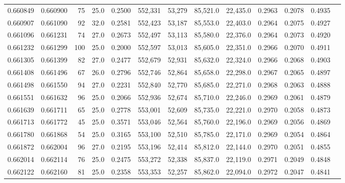 \begin{tabular}{rrrrrrrrrrrrr}
0.660849 & 0.660900 &    75 & 25.0 &                                     0.2500 & 552,331 &  53,279 &  85,521.0 &  22,435.0 & 0.2963 & 0.2078 & 0.4935 \\
0.660907 & 0.661090 &    92 & 32.0 &                                     0.2581 & 552,423 &  53,187 &  85,553.0 &  22,403.0 & 0.2964 & 0.2075 & 0.4927 \\
0.661096 & 0.661231 &    74 & 27.0 &                                     0.2673 & 552,497 &  53,113 &  85,580.0 &  22,376.0 & 0.2964 & 0.2073 & 0.4920 \\
0.661232 & 0.661299 &   100 & 25.0 &                                     0.2000 & 552,597 &  53,013 &  85,605.0 &  22,351.0 & 0.2966 & 0.2070 & 0.4911 \\
0.661305 & 0.661399 &    82 & 27.0 &                                     0.2477 & 552,679 &  52,931 &  85,632.0 &  22,324.0 & 0.2966 & 0.2068 & 0.4903 \\
0.661408 & 0.661496 &    67 & 26.0 &                                     0.2796 & 552,746 &  52,864 &  85,658.0 &  22,298.0 & 0.2967 & 0.2065 & 0.4897 \\
0.661498 & 0.661550 &    94 & 27.0 &                                     0.2231 & 552,840 &  52,770 &  85,685.0 &  22,271.0 & 0.2968 & 0.2063 & 0.4888 \\
0.661551 & 0.661632 &    96 & 25.0 &                                     0.2066 & 552,936 &  52,674 &  85,710.0 &  22,246.0 & 0.2969 & 0.2061 & 0.4879 \\
0.661639 & 0.661711 &    65 & 25.0 &                                     0.2778 & 553,001 &  52,609 &  85,735.0 &  22,221.0 & 0.2970 & 0.2058 & 0.4873 \\
0.661713 & 0.661772 &    45 & 25.0 &                                     0.3571 & 553,046 &  52,564 &  85,760.0 &  22,196.0 & 0.2969 & 0.2056 & 0.4869 \\
0.661780 & 0.661868 &    54 & 25.0 &                                     0.3165 & 553,100 &  52,510 &  85,785.0 &  22,171.0 & 0.2969 & 0.2054 & 0.4864 \\
0.661872 & 0.662004 &    96 & 27.0 &                                     0.2195 & 553,196 &  52,414 &  85,812.0 &  22,144.0 & 0.2970 & 0.2051 & 0.4855 \\
0.662014 & 0.662114 &    76 & 25.0 &                                     0.2475 & 553,272 &  52,338 &  85,837.0 &  22,119.0 & 0.2971 & 0.2049 & 0.4848 \\
0.662122 & 0.662160 &    81 & 25.0 &                                     0.2358 & 553,353 &  52,257 &  85,862.0 &  22,094.0 & 0.2972 & 0.2047 & 0.4841 \\

\end{tabular}
